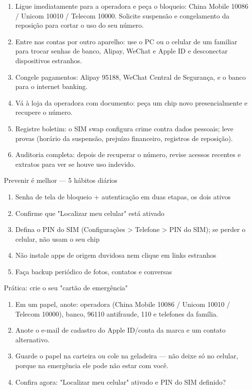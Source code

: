 \begin{enumerate}
  \item Ligue imediatamente para a operadora e peça o bloqueio: China Mobile 10086 / Unicom 10010 / Telecom 10000. Solicite suspensão e congelamento da reposição para cortar o uso do seu número.
  \item Entre nas contas por outro aparelho: use o PC ou o celular de um familiar para trocar senhas de banco, Alipay, WeChat e Apple ID e desconectar dispositivos estranhos.
  \item Congele pagamentos: Alipay 95188, WeChat Central de Segurança, e o banco para o internet banking.
  \item Vá à loja da operadora com documento: peça um chip novo presencialmente e recupere o número.
  \item Registre boletim: o SIM swap configura crime contra dados pessoais; leve provas (horário da suspensão, prejuízo financeiro, registros de reposição).
  \item Auditoria completa: depois de recuperar o número, revise acessos recentes e extratos para ver se houve uso indevido.
\end{enumerate}

\begin{tcbwarn}{Prevenir é melhor — 5 hábitos diários}
\begin{enumerate}
  \item Senha de tela de bloqueio + autenticação em duas etapas, os dois ativos
  \item Confirme que "Localizar meu celular" está ativado
  \item Defina o PIN do SIM (Configurações > Telefone > PIN do SIM); se perder o celular, não usam o seu chip
  \item Não instale apps de origem duvidosa nem clique em links estranhos
  \item Faça backup periódico de fotos, contatos e conversas
\end{enumerate}

\end{tcbwarn}

\begin{tcbpractice}{Prática: crie o seu "cartão de emergência"}
\begin{enumerate}
  \item Em um papel, anote: operadora (China Mobile 10086 / Unicom 10010 / Telecom 10000), banco, 96110 antifraude, 110 e telefones da família.
  \item Anote o e-mail de cadastro do Apple ID/conta da marca e um contato alternativo.
  \item Guarde o papel na carteira ou cole na geladeira — não deixe só no celular, porque na emergência ele pode não estar com você.
  \item Confira agora: "Localizar meu celular" ativado e PIN do SIM definido?
\end{enumerate}

\end{tcbpractice}

